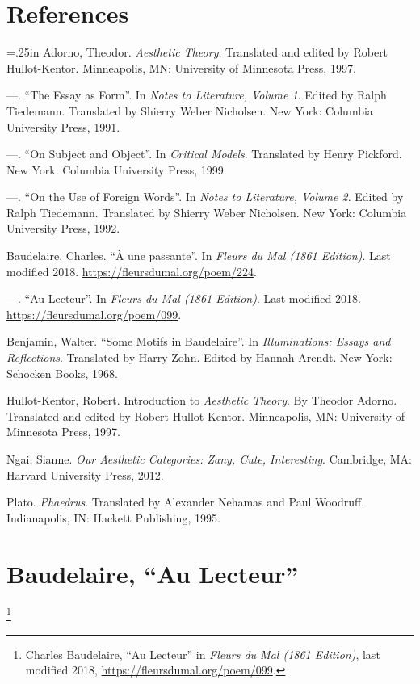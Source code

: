\documentclass[12pt]{article}
\makeatletter
\newcommand{\hangpara}[2]{\hangindent#1\hangafter#2\noindent}
\newenvironment{hangparas}[2]{\setlength{\parindent}{\z@}%
  \everypar={\hangpara{#1}{#2}}}{\par}
\makeatother
\begin{document}
\section{References}
\begin{singlespacing}
\begin{hangparas}{.25in}{1}
Adorno, Theodor. \textit{Aesthetic Theory}. Translated and edited by Robert Hullot-Kentor. Minneapolis, MN: University of Minnesota Press, 1997.

---. ``The Essay as Form''. In \textit{Notes to Literature, Volume 1}. Edited by Ralph Tiedemann. Translated by Shierry Weber Nicholsen. New York: Columbia University Press, 1991.

---. ``On Subject and Object''. In \textit{Critical Models}. Translated by Henry Pickford. New York: Columbia University Press, 1999.

---. ``On the Use of Foreign Words''. In \textit{Notes to Literature, Volume 2}. Edited by Ralph Tiedemann. Translated by Shierry Weber Nicholsen. New York: Columbia University Press, 1992.

Baudelaire, Charles. ``\`A une passante''. In \textit{Fleurs du Mal (1861 Edition)}. Last modified 2018. \url{https://fleursdumal.org/poem/224}.

---. ``Au Lecteur''. In \textit{Fleurs du Mal (1861 Edition)}. Last modified 2018. \url{https://fleursdumal.org/poem/099}.

Benjamin, Walter. ``Some Motifs in Baudelaire''. In \textit{Illuminations: Essays and Reflections}. Translated by Harry Zohn. Edited by Hannah Arendt. New York: Schocken Books, 1968.

Hullot-Kentor, Robert. Introduction to \textit{Aesthetic Theory}. By Theodor Adorno. Translated and edited by Robert Hullot-Kentor. Minneapolis, MN: University of Minnesota Press, 1997.

Ngai, Sianne. \textit{Our Aesthetic Categories: Zany, Cute, Interesting}. Cambridge, MA: Harvard University Press, 2012.

Plato. \textit{Phaedrus}. Translated by Alexander Nehamas and Paul Woodruff. Indianapolis, IN: Hackett Publishing, 1995.
\end{hangparas}
\end{singlespacing}

\newpage
\appendix
\section{Baudelaire, ``Au Lecteur''}
\footnote{Charles Baudelaire, ``Au Lecteur'' in \textit{Fleurs du Mal (1861 Edition)}, last modified 2018, \url{https://fleursdumal.org/poem/099}.}
\end{document}
